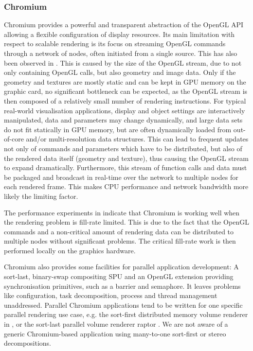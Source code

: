 \subsubsection{Chromium}

Chromium \cite{HHNFAKK:02} provides a powerful and transparent abstraction of
the OpenGL API allowing a flexible configuration of display resources. Its
main limitation with respect to scalable rendering is its focus on
streaming OpenGL commands through a network of nodes, often initiated from a
single source. This has also been observed in \cite{SWNH:03}.
This is caused by the size of the OpenGL stream, due to not only containing OpenGL
calls, but also geometry and image data. Only if the geometry and textures are
mostly static and can be kept in GPU memory on the graphic card, no
significant bottleneck can be expected, as the OpenGL stream is then composed of
a relatively small number of rendering instructions. For typical
real-world visualisation applications, display and object settings are
interactively manipulated, data and parameters may change dynamically, and
large data sets do not fit statically in GPU memory, but are often dynamically
loaded from out-of-core and/or multi-resolution data structures. This can lead
to frequent updates not only of commands and parameters which have to be
distributed, but also of the rendered data itself (geometry and texture), thus
causing the OpenGL stream to expand dramatically. Furthermore, this stream of
function calls and data must be packaged and broadcast in real-time over the
network to multiple nodes for each rendered frame. This makes CPU performance
and network bandwidth more likely the limiting factor.

The performance experiments in \cite{HHNFAKK:02} indicate that Chromium is
working well when the rendering problem is fill-rate limited. This is due
to the fact that the OpenGL commands and a non-critical amount of rendering data
can be distributed to multiple nodes without significant problems. The
critical fill-rate work is then performed locally on the graphics hardware.

Chromium also provides some facilities for parallel application development:
A sort-last, binary-swap compositing SPU and an OpenGL extension
providing synchronisation primitives, such as a barrier and semaphore. It leaves
problems like configuration, task decomposition, process and
thread management unaddressed. Parallel Chromium applications tend to be written
for one specific parallel rendering use case, e.g. the sort-first
distributed memory volume renderer in \cite{BHPB:03}, or the sort-last parallel
volume renderer raptor \cite{Raptor}. We are not aware of a generic
Chromium-based application using many-to-one sort-first or stereo
decompositions.

